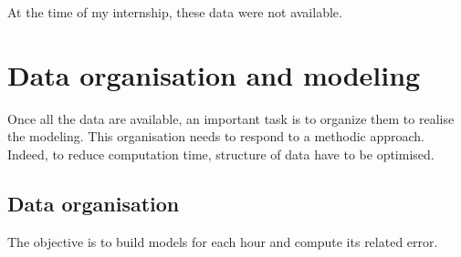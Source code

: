 \documentclass[12pt,twoside]{reedthesis}
\theoremstyle{definition}
\theoremstyle{definition}
\theoremstyle{definition}
\theoremstyle{remark}
\begin{document}
At the time of my internship, these data were not available.

\chapter{Data organisation and modeling}\label{data-model}

Once all the data are available, an important task is to organize them
to realise the modeling. This organisation needs to respond to a
methodic approach. Indeed, to reduce computation time, structure of data
have to be optimised.

\section{Data organisation}\label{data-organisation}

The objective is to build models for each hour and compute its related
error.
\end{document}
